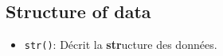 \documentclass[10pt, french]{article}
\begin{document}
\begin{multicols*}[3] 
\section*{Structure of data}
\begin{itemize}
	\item	\texttt{str()}: Décrit la \textbf{str}ucture des données.
\end{itemize}
\end{multicols*}
\end{document}
